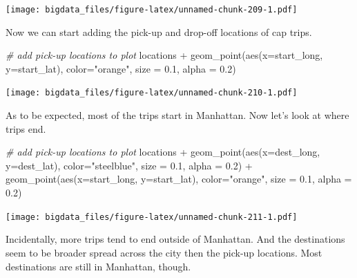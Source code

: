 \documentclass[
  12pt,
]{style/krantz}
\newenvironment{Shaded}{\begin{snugshade}}{\end{snugshade}}
\newcommand{\AttributeTok}[1]{\textcolor[rgb]{0.77,0.63,0.00}{#1}}
\newcommand{\CommentTok}[1]{\textcolor[rgb]{0.56,0.35,0.01}{\textit{#1}}}
\newcommand{\FloatTok}[1]{\textcolor[rgb]{0.00,0.00,0.81}{#1}}
\newcommand{\FunctionTok}[1]{\textcolor[rgb]{0.00,0.00,0.00}{#1}}
\newcommand{\NormalTok}[1]{#1}
\newcommand{\SpecialCharTok}[1]{\textcolor[rgb]{0.00,0.00,0.00}{#1}}
\newcommand{\StringTok}[1]{\textcolor[rgb]{0.31,0.60,0.02}{#1}}
\begin{document}
\texttt{[image: bigdata\_files/figure-latex/unnamed-chunk-209-1.pdf]}

Now we can start adding the pick-up and drop-off locations of cap trips.

\begin{Shaded}
\begin{Highlighting}[]
\CommentTok{\# add pick{-}up locations to plot}
\NormalTok{locations }\SpecialCharTok{+} 
     \FunctionTok{geom\_point}\NormalTok{(}\FunctionTok{aes}\NormalTok{(}\AttributeTok{x=}\NormalTok{start\_long, }\AttributeTok{y=}\NormalTok{start\_lat),}
                \AttributeTok{color=}\StringTok{"orange"}\NormalTok{,}
                \AttributeTok{size =} \FloatTok{0.1}\NormalTok{,}
                \AttributeTok{alpha =} \FloatTok{0.2}\NormalTok{)}
\end{Highlighting}
\end{Shaded}

\texttt{[image: bigdata\_files/figure-latex/unnamed-chunk-210-1.pdf]}

As to be expected, most of the trips start in Manhattan. Now let's look at where trips end.

\begin{Shaded}
\begin{Highlighting}[]
\CommentTok{\# add pick{-}up locations to plot}
\NormalTok{locations }\SpecialCharTok{+}
     \FunctionTok{geom\_point}\NormalTok{(}\FunctionTok{aes}\NormalTok{(}\AttributeTok{x=}\NormalTok{dest\_long, }\AttributeTok{y=}\NormalTok{dest\_lat),}
                \AttributeTok{color=}\StringTok{"steelblue"}\NormalTok{,}
                \AttributeTok{size =} \FloatTok{0.1}\NormalTok{,}
                \AttributeTok{alpha =} \FloatTok{0.2}\NormalTok{) }\SpecialCharTok{+}
     \FunctionTok{geom\_point}\NormalTok{(}\FunctionTok{aes}\NormalTok{(}\AttributeTok{x=}\NormalTok{start\_long, }\AttributeTok{y=}\NormalTok{start\_lat),}
                \AttributeTok{color=}\StringTok{"orange"}\NormalTok{,}
                \AttributeTok{size =} \FloatTok{0.1}\NormalTok{,}
                \AttributeTok{alpha =} \FloatTok{0.2}\NormalTok{)}
\end{Highlighting}
\end{Shaded}

\texttt{[image: bigdata\_files/figure-latex/unnamed-chunk-211-1.pdf]}

Incidentally, more trips tend to end outside of Manhattan. And the destinations seem to be broader spread across the city then the pick-up locations. Most destinations are still in Manhattan, though.
\end{document}
